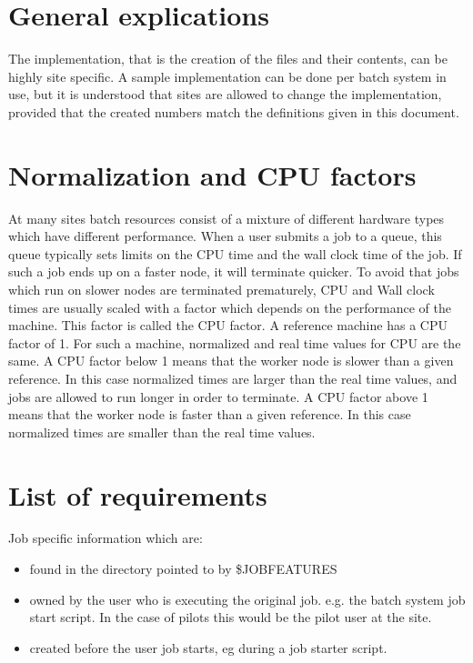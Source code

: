 \documentclass[12pt,a4paper]{article}
\begin{document}
\section{General explications}
\label{sec:GeneralExplications}

The implementation, that is the creation of the files and their contents, can
be highly site specific. A sample implementation can be done per batch
system in use, but it is understood that sites are allowed to change the
implementation, provided that the created numbers match the definitions
given in this document.

\section{Normalization and CPU factors}
\label{sec:Normalization}

At many sites batch resources consist of a mixture of different hardware
types which have different performance. When a user submits a job to a queue,
this queue typically sets limits on the CPU time and the wall clock time of
the job. If such a job ends up on a faster node, it will terminate quicker.
To avoid that jobs which run on slower nodes are terminated prematurely, CPU
and Wall clock times are usually scaled with a factor which depends on the
performance of the machine. This factor is called the CPU factor. A
reference machine has a CPU factor of 1. For such a machine, normalized and
real time values for CPU are the same. A CPU factor below 1 means that the
worker node is slower than a given reference. In this case normalized times
are larger than the real time values, and jobs are allowed to run longer in
order to terminate. A CPU factor above 1 means that the worker node is
faster than a given reference. In this case normalized times are smaller
than the real time values.

\section{List of requirements}
\label{sec:ListOfRequirements}

Job specific information which are:
\begin{itemize}
\item found in the directory pointed to by \$JOBFEATURES
\item owned by the user who is executing the original job. e.g. the batch
system job start script. In the case of pilots this would be the pilot user at the site.
\item created before the user job starts, eg during a job starter script.
\end{itemize}
\end{document}
